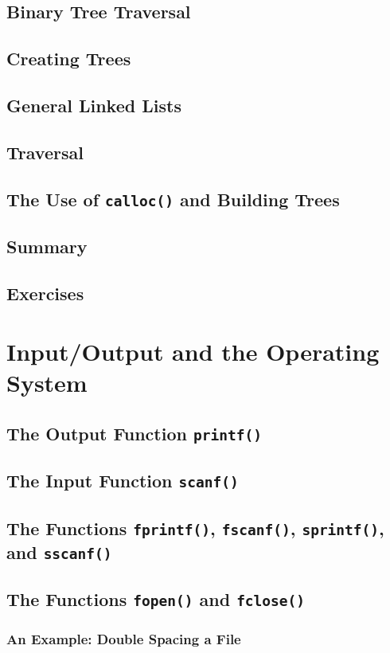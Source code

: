 \documentclass[12pt]{book}
\begin{document}
\section{Binary Tree Traversal}
\section{Creating Trees}
\section{General Linked Lists}
\section{Traversal}
\section{The Use of \texttt{calloc()} and Building Trees}
\section{Summary}
\section{Exercises}

\chapter{Input/Output and the Operating System}

\section{The Output Function \texttt{printf()}}
\section{The Input Function \texttt{scanf()}}
\section{The Functions \texttt{fprintf()}, \texttt{fscanf()}, \texttt{sprintf()}, and \texttt{sscanf()}}
\section{The Functions \texttt{fopen()} and \texttt{fclose()}}
\subsection{An Example: Double Spacing a File}
\end{document}
